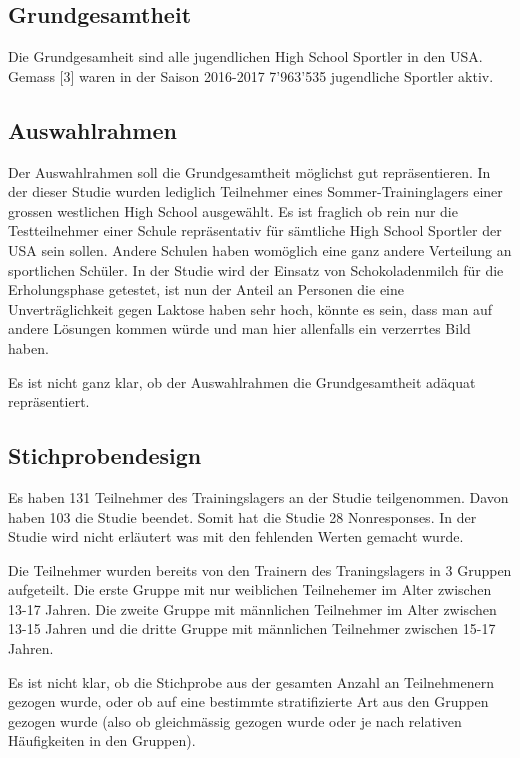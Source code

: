 \documentclass[
]{article}
\begin{document}
\hypertarget{grundgesamtheit}{%
\subsection{Grundgesamtheit}\label{grundgesamtheit}}

Die Grundgesamheit sind alle jugendlichen High School Sportler in den
USA. Gemass {[}3{]} waren in der Saison 2016-2017 7'963'535 jugendliche
Sportler aktiv.

\hypertarget{auswahlrahmen}{%
\subsection{Auswahlrahmen}\label{auswahlrahmen}}

Der Auswahlrahmen soll die Grundgesamtheit möglichst gut repräsentieren.
In der dieser Studie wurden lediglich Teilnehmer eines
Sommer-Traininglagers einer grossen westlichen High School ausgewählt.
Es ist fraglich ob rein nur die Testteilnehmer einer Schule
repräsentativ für sämtliche High School Sportler der USA sein sollen.
Andere Schulen haben womöglich eine ganz andere Verteilung an
sportlichen Schüler. In der Studie wird der Einsatz von Schokoladenmilch
für die Erholungsphase getestet, ist nun der Anteil an Personen die eine
Unverträglichkeit gegen Laktose haben sehr hoch, könnte es sein, dass
man auf andere Lösungen kommen würde und man hier allenfalls ein
verzerrtes Bild haben.

Es ist nicht ganz klar, ob der Auswahlrahmen die Grundgesamtheit adäquat
repräsentiert.

\hypertarget{stichprobendesign}{%
\subsection{Stichprobendesign}\label{stichprobendesign}}

Es haben 131 Teilnehmer des Trainingslagers an der Studie teilgenommen.
Davon haben 103 die Studie beendet. Somit hat die Studie 28
Nonresponses. In der Studie wird nicht erläutert was mit den fehlenden
Werten gemacht wurde.

Die Teilnehmer wurden bereits von den Trainern des Traningslagers in 3
Gruppen aufgeteilt. Die erste Gruppe mit nur weiblichen Teilnehemer im
Alter zwischen 13-17 Jahren. Die zweite Gruppe mit männlichen Teilnehmer
im Alter zwischen 13-15 Jahren und die dritte Gruppe mit männlichen
Teilnehmer zwischen 15-17 Jahren.

Es ist nicht klar, ob die Stichprobe aus der gesamten Anzahl an
Teilnehmenern gezogen wurde, oder ob auf eine bestimmte stratifizierte
Art aus den Gruppen gezogen wurde (also ob gleichmässig gezogen wurde
oder je nach relativen Häufigkeiten in den Gruppen).
\end{document}
